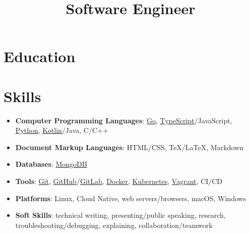 \documentclass[a4paper, 10pt, roman, colorlinks, linkcolor=purple, filecolor=purple, citecolor=blue, urlcolor=blue]{moderncv}
\title{Software Engineer}
\begin{document}
	\maketitle
	\section{Education}

	\section{Skills}
	\begin{itemize}
		\item \textbf{Computer Programming Languages}: \href{https://go.dev}{Go}, \href{https://typescriptlang.org}{TypeScript}/JavaScript, \href{https://python.org}{Python}, \href{https://kotlinlang.org}{Kotlin}/Java, C/C++
		\item \textbf{Document Markup Languages}: HTML/CSS, \TeX/\LaTeX, Markdown
		\item \textbf{Databases}: \href{https://www.mongodb.com}{MongoDB}
		\item \textbf{Tools}: \href{https://git-scm.com}{Git}, \href{https://github.com}{GitHub}/\href{https://gitlab.com}{GitLab}, \href{https://www.docker.com}{Docker}, \href{https://kubernetes.io}{Kubernetes}, \href{https://vagrantup.com}{Vagrant}, CI/CD
		\item \textbf{Platforms}: Linux, Cloud Native, web servers/browsers, macOS, Windows
		\item \textbf{Soft Skills}: technical writing, presenting/public speaking, research, troubleshooting/debugging, explaining, collaboration/teamwork
	\end{itemize}
\end{document}
